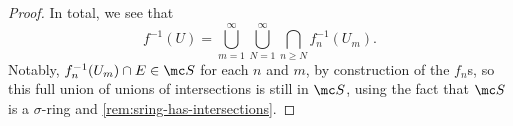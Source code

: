 \documentclass[../notes.tex]{subfiles}
\begin{document}
\begin{proof}
	In total, we see that
	\[f^{-1}(U)=\bigcup_{m=1}^\infty\bigcup_{N=1}^\infty\bigcap_{n\ge N}f_n^{-1}(U_m).\]
	Notably, $f_n^{-1}(U_m)\cap E\in\mc S$ for each $n$ and $m$, by construction of the $f_n$s, so this full union of unions of intersections is still in $\mc S$, using the fact that $\mc S$ is a $\sigma$-ring and \autoref{rem:sring-has-intersections}.
\end{proof}


			
\end{document}
